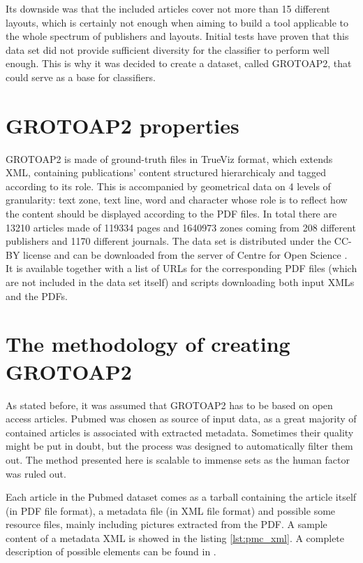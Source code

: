 Its downside was that the included articles cover not more than 15 different layouts, which is certainly not enough when aiming to build a tool applicable to the whole spectrum of publishers and layouts. Initial tests have proven that this data set did not provide sufficient diversity for the classifier to perform well enough. This is why it was decided to create a dataset, called GROTOAP2, that could serve as a base for classifiers.

\section{GROTOAP2 properties}
GROTOAP2 is made of ground-truth files in TrueViz format, which extends XML, containing publications' content structured hierarchicaly and tagged according to its role. This is accompanied by geometrical data on 4 levels of granularity: text zone, text line, word and character whose role is to reflect how the content should be displayed according to the PDF files. In total there are 13210 articles made of 119334 pages and 1640973 zones coming from 208 different publishers and 1170 different journals. The data set is distributed under the CC-BY license and can be downloaded from the server of Centre for Open Science \cite{CeON}. It is available together with a list of URLs for the corresponding PDF files (which are not included in the data set itself) and scripts downloading both input XMLs and the PDFs.

\section{The methodology of creating GROTOAP2}
As stated before, it was assumed that GROTOAP2 has to be based on open access articles. Pubmed was chosen as source of input data, as a great majority of contained articles is associated with extracted metadata. Sometimes their quality might be put in doubt, but the process was designed to automatically filter them out. The method presented here is scalable to immense sets as the human factor was ruled out.

Each article in the Pubmed dataset comes as a tarball containing the article itself (in PDF file format), a metadata file (in XML file format) and possible some resource files, mainly including pictures extracted from the PDF. A sample content of a metadata XML is showed in the listing \ref{lst:pmc_xml}. A complete description of possible elements can be found in \cite{PubmedXML}.


